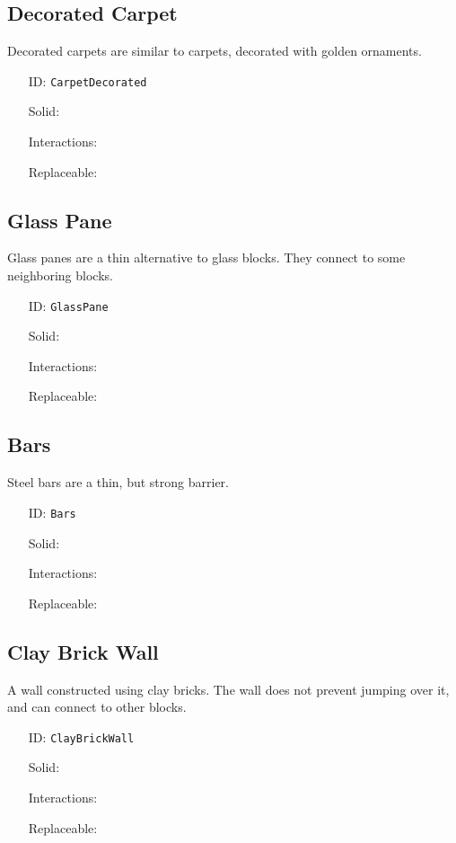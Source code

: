 \subsection{Decorated Carpet}\label{subsec:blocks_decorated carpet}
Decorated carpets are similar to carpets, decorated with golden ornaments.
\newline
\begin{itemize}[nosep]
\item[ID:] \texttt{CarpetDecorated}
\item[Solid:]  \Checkmark \item[Interactions:]  \Checkmark \item[Replaceable:]  \XSolidBrush \end{itemize}

\subsection{Glass Pane}\label{subsec:blocks_glass pane}
Glass panes are a thin alternative to glass blocks.
                They connect to some neighboring blocks.
\newline
\begin{itemize}[nosep]
\item[ID:] \texttt{GlassPane}
\item[Solid:]  \Checkmark \item[Interactions:]  \XSolidBrush \item[Replaceable:]  \XSolidBrush \end{itemize}

\subsection{Bars}\label{subsec:blocks_bars}
Steel bars are a thin, but strong barrier.
\newline
\begin{itemize}[nosep]
\item[ID:] \texttt{Bars}
\item[Solid:]  \Checkmark \item[Interactions:]  \XSolidBrush \item[Replaceable:]  \XSolidBrush \end{itemize}

\subsection{Clay Brick Wall}\label{subsec:blocks_clay brick wall}
A wall constructed using clay bricks.
                The wall does not prevent jumping over it, and can connect to other blocks.
\newline
\begin{itemize}[nosep]
\item[ID:] \texttt{ClayBrickWall}
\item[Solid:]  \Checkmark \item[Interactions:]  \XSolidBrush \item[Replaceable:]  \XSolidBrush \end{itemize}

